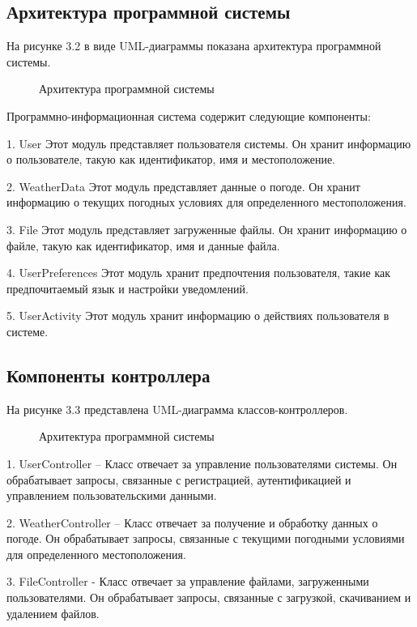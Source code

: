 \subsection{Архитектура программной системы}

На рисунке 3.2 в виде UML-диаграммы показана архитектура программной системы.

\begin{figure}
\center{\texttt{[image: un5]}}
\caption{Архитектура программной системы}
\label{un5:image}
\end{figure}

Программно-информационная система содержит следующие компоненты:

1.	User Этот модуль представляет пользователя системы. Он хранит информацию о пользователе, такую как идентификатор, имя и местоположение.

2.	WeatherData Этот модуль представляет данные о погоде. Он хранит информацию о текущих погодных условиях для определенного местоположения.

3.	File Этот модуль представляет загруженные файлы. Он хранит информацию о файле, такую как идентификатор, имя и данные файла.

4.	UserPreferences Этот модуль хранит предпочтения пользователя, такие как предпочитаемый язык и настройки уведомлений.

5.	UserActivity Этот модуль хранит информацию о действиях пользователя в системе.

\subsection{Компоненты контроллера}
На рисунке 3.3 представлена UML-диаграмма классов-контроллеров.
\begin{figure}
	\center{\texttt{[image: un6]}}
	\caption{Архитектура программной системы}
	\label{un6:image}
\end{figure}
1. UserController – Класс отвечает за управление пользователями системы. Он обрабатывает запросы, связанные с регистрацией, аутентификацией и управлением пользовательскими данными.

2. WeatherController – Класс отвечает за получение и обработку данных о погоде. Он обрабатывает запросы, связанные с текущими погодными условиями для определенного местоположения. 

3. FileController - Класс отвечает за управление файлами, загруженными пользователями. Он обрабатывает запросы, связанные с загрузкой, скачиванием и удалением файлов.

